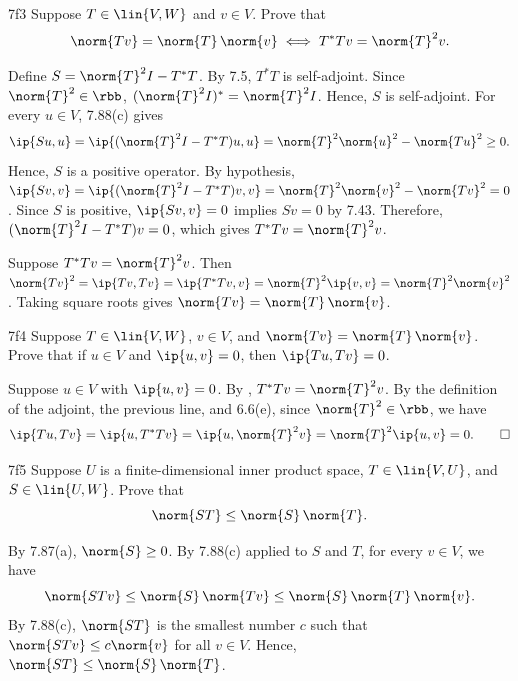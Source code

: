 \begin{exercise}{7f3}
    Suppose $T \in \lin{V, W}$ and $v \in V$.
    Prove that
    \[
        \norm{Tv} = \norm{T}\,\norm{v} \iff T^\ast Tv = \norm{T}^2 v.
    \]
\end{exercise}

\begin{soliff}
    \rightimp Define $S = \norm{T}^2 I - T^\ast T$.
    By 7.5, $T^\ast T$ is self-adjoint.
    Since $\norm{T}^2 \in \rbb$, $(\norm{T}^2 I)^\ast = \norm{T}^2 I$.
    Hence, $S$ is self-adjoint.
    For every $u \in V$, 7.88(c) gives
    \[
        \ip{Su, u} = \ip{(\norm{T}^2 I - T^\ast T)u, u} = \norm{T}^2 \norm{u}^2 - \norm{Tu}^2 \geq 0.
    \]
    Hence, $S$ is a positive operator.
    By hypothesis, $\ip{Sv, v} = \ip{(\norm{T}^2 I - T^\ast T)v, v} = \norm{T}^2 \norm{v}^2 - \norm{Tv}^2 = 0$.
    Since $S$ is positive, $\ip{Sv, v} = 0$ implies $Sv = 0$ by 7.43.
    Therefore, $(\norm{T}^2 I - T^\ast T)v = 0$, which gives $T^\ast Tv = \norm{T}^2 v$.

    \leftimp Suppose $T^\ast Tv = \norm{T}^2 v$.
    Then $\norm{Tv}^2 = \ip{Tv, Tv} = \ip{T^\ast Tv, v} = \norm{T}^2 \ip{v, v} = \norm{T}^2 \norm{v}^2$.
    Taking square roots gives $\norm{Tv} = \norm{T}\,\norm{v}$.
\end{soliff}

\begin{exercise}{7f4}
    Suppose $T \in \lin{V, W}$, $v \in V$, and $\norm{Tv} = \norm{T}\,\norm{v}$.
    Prove that if $u \in V$ and $\ip{u, v} = 0$, then $\ip{Tu, Tv} = 0$.
\end{exercise}

\begin{sol}
    Suppose $u \in V$ with $\ip{u, v} = 0$.
    By , $T^\ast T v = \norm{T}^2 v$.
    By the definition of the adjoint, the previous line, and 6.6(e), since $\norm{T}^2 \in \rbb$, we have
    \[
        \ip{T u, T v} = \ip{u, T^\ast T v} = \ip{u, \norm{T}^2 v} = \norm{T}^2 \ip{u, v} = 0. \qedhere
    \]
\end{sol}

\begin{exercise}{7f5}
    Suppose $U$ is a finite-dimensional inner product space, $T \in \lin{V, U}$, and $S \in \lin{U, W}$.
    Prove that
    \[
        \norm{ST} \leq \norm{S}\,\norm{T}.
    \]
\end{exercise}

\begin{sol}
    By 7.87(a), $\norm{S} \geq 0$.
    By 7.88(c) applied to $S$ and $T$, for every $v \in V$, we have
    \[
        \norm{ST v} \leq \norm{S}\,\norm{T v} \leq \norm{S}\,\norm{T}\,\norm{v}.
    \]
    By 7.88(c), $\norm{ST}$ is the smallest number $c$ such that $\norm{ST v} \leq c \norm{v}$ for all $v \in V$.
    Hence, $\norm{ST} \leq \norm{S}\,\norm{T}$.
\end{sol}

